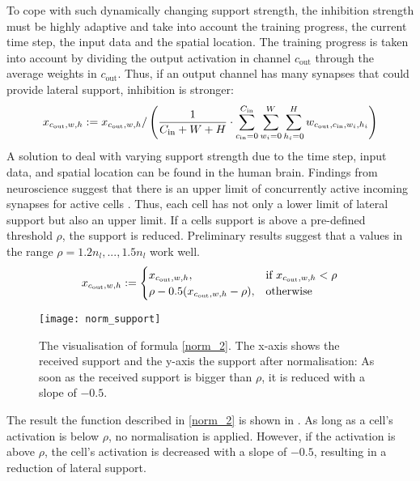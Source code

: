 To cope with such dynamically changing support strength, the inhibition strength must be highly adaptive and take into account the training progress, the current time step, the input data and the spatial location. 
The training progress is taken into account by dividing the output activation in channel $c_{\text{out}}$ through the average weights in $c_{\text{out}}$. Thus, if an output channel has many synapses that could provide lateral support, inhibition is stronger:
%
\begin{align}\eqlbl{norm_1}
    x_{c_{\text{out}},w,h} := x_{c_{\text{out}},w,h} / \left( \frac{1}{C_{\text{in}} + W + H} \cdot \sum_{c_{\text{in}}=0}^{C_{\text{in}}} \sum_{w_i=0}^{W} \sum_{h_i=0}^{H} w_{c_{\text{out}}, c_{\text{in}},w_i,h_i}  \right)
\end{align}
%
A solution to deal with varying support strength due to the time step, input data, and spatial location can be found in the human brain.
Findings from neuroscience suggest that there is an upper limit of concurrently active incoming synapses for active cells . Thus, each cell has not only a lower limit of lateral support but also an upper limit.
If a cells support is above a pre-defined threshold $\rho$, the support is reduced.
Preliminary results suggest that a values in the range $\rho = 1.2n_l, ..., 1.5n_l$ work well.
%
\begin{align}\eqlbl{norm_2}
	x_{c_{\text{out}},w,h} := \begin{cases}
      		x_{c_{\text{out}},w,h}, & \text{if } x_{c_{\text{out}},w,h} < \rho \\
      		\rho - 0.5(x_{c_{\text{out}},w,h} - \rho), & \text{otherwise}
    	\end{cases}
\end{align}
%
\begin{figure}[h]
    \centering
    \texttt{[image: norm\_support]}
    \caption[Inhibition for too many activated cells]{The visualisation of formula \eqref{norm_2}. The x-axis shows the received support and the y-axis the support after normalisation: As soon as the received support is bigger than $\rho$, it is reduced with a slope of $-0.5$.}
\end{figure}
The result the function described in \eqref{norm_2} is shown in . As long as a cell's activation is below $\rho$, no normalisation is applied. However, if the activation is above $\rho$, the cell's activation is decreased with a slope of $-0.5$, resulting in a reduction of lateral support.



